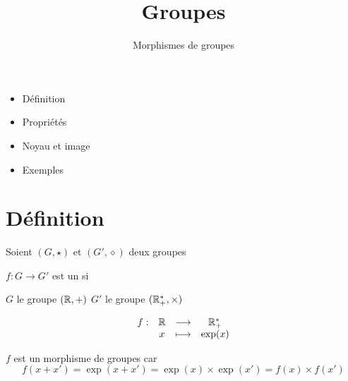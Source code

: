 


\newcommand{\GL}{\mathcal{G}\ell}











\title{{\bf Groupes}}
\subtitle{Morphismes de groupes}

\begin{frame}
  
  \debutmontitre

  \pause

{\footnotesize
\hfill
{}
\begin{minipage}{0.6\textwidth}
  \begin{itemize}
    \item<3-> Définition
    \item<4-> Propriétés
    \item<5-> Noyau et image
    \item<6-> Exemples
  \end{itemize}
\end{minipage}
}

\end{frame}

\setcounter{framenumber}{0}




\section{Définition}

\begin{frame}
Soient $(G,\star)$ et $(G',\diamond)$ deux groupes
\begin{mydefinition}
$f : G \longrightarrow G'$ 
\pause
est un  si 
\end{mydefinition}

\pause

\begin{exemple}
$G$ le groupe $(\mathbb{R},+)$ \quad $G'$ le groupe $(\mathbb{R}_+^*,\times)$

$$
\begin{array}{lccc}
f : & \mathbb{R} & \longrightarrow & \mathbb{R}^*_+ \\
    & x  & \longmapsto & \exp(x) \\
\end{array}
$$

\pause

$f$ est un morphisme de groupes car
$$f(x+x') =\exp(x+x')= \exp(x) \times \exp(x') = f(x) \times f(x')$$
\end{exemple}

\end{frame}

